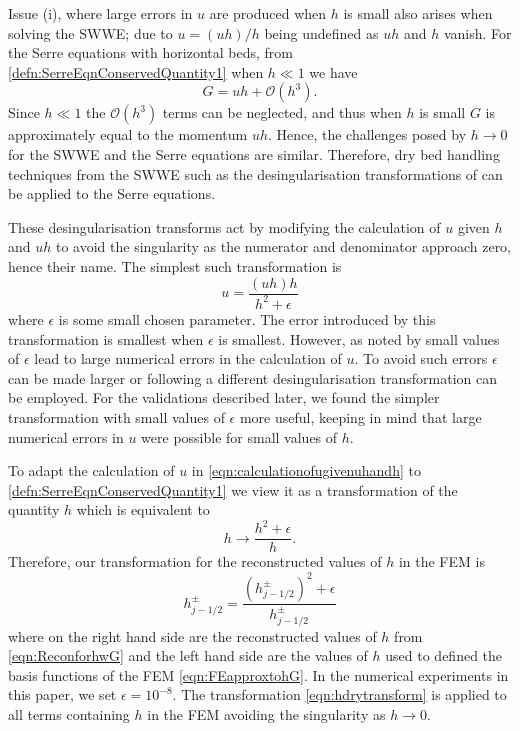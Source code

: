 \documentclass[times]{elsarticle}
\begin{document}
Issue (i), where large errors in $u$ are produced when $h$ is small also arises when solving the SWWE; due to $u = (uh)/h $ being undefined as $u h $ and $h$ vanish. For the Serre equations with horizontal beds, from \eqref{defn:SerreEqnConservedQuantity1} when $h \ll 1$ we have
\begin{equation*}
G = uh + \mathcal{O}\left(h^3\right).
\end{equation*}
Since $h \ll 1$ the $\mathcal{O}\left(h^3\right)$ terms can be neglected, and thus when $h$ is small $G$ is approximately equal to the momentum $uh$. Hence, the challenges posed by $h \rightarrow 0$ for the SWWE and the Serre equations are similar. Therefore, dry bed handling techniques from the SWWE such as the desingularisation transformations of \citet{Kurganov-Petrova-2007-707} can be applied to the Serre equations.

These desingularisation transforms act by modifying the calculation of $u$ given $h$ and $uh$ to avoid the singularity as the numerator and denominator approach zero, hence their name. The simplest such transformation is
\begin{equation}
u = \frac{(uh) h}{h^2 + \epsilon}
\label{eqn:calculationofugivenuhandh}
\end{equation}
where $\epsilon$ is some small chosen parameter. The error introduced by this transformation is smallest when $\epsilon$ is smallest. However, as noted by \citet{Kurganov-Petrova-2007-707} small values of $\epsilon$ lead to large numerical errors in the calculation of $u$. To avoid such errors $\epsilon$ can be made larger or following \citet{Kurganov-Petrova-2007-707} a different desingularisation transformation can be employed. For the validations described later, we found the simpler transformation with small values of $\epsilon$ more useful, keeping in mind that large numerical errors in $u$ were possible for small values of $h$.

To adapt the calculation of $u$ in \eqref{eqn:calculationofugivenuhandh} to \eqref{defn:SerreEqnConservedQuantity1} we view it as a transformation of the quantity $h$ which is equivalent to
\begin{equation}
\label{eqn:hsimpletransform}
h \rightarrow  \frac{h^2 + \epsilon}{h}.
\end{equation}
Therefore, our transformation for the reconstructed values of $h$ in the FEM is
\begin{equation}
\label{eqn:hdrytransform}
h^\pm_{j-1/2}  = \frac{ \left(h^\pm_{j-1/2} \right)^2  + \epsilon}{h^\pm_{j-1/2}}
\end{equation}
where on the right hand side are the reconstructed values of $h$ from \eqref{eqn:ReconforhwG} and the left hand side are the values of $h$ used to defined the basis functions of the FEM \eqref{eqn:FEapproxtohG}. In the numerical experiments in this paper, we set $\epsilon = 10^{-8}$. The transformation \eqref{eqn:hdrytransform} is applied to all terms containing $h$ in the FEM avoiding the singularity as $h \rightarrow 0$.
\end{document}
